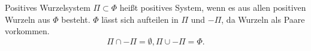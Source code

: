 \documentclass[18pt,draft]{beamer}
\begin{document}
\begin{frame}{Positives Wurzelsystem}
    \( \Pi \subset \Phi \) heißt positives 
    System, wenn es aus allen positiven Wurzeln 
    aus \( \Phi \) besteht.
    \( \Phi \) lässt sich aufteilen in 
    \( \Pi \) und \( -\Pi \), da Wurzeln als Paare 
    vorkommen.
    \[ \Pi \cap -\Pi = \emptyset, \Pi \cup -\Pi = \Phi. \]
\end{frame}
\end{document}
